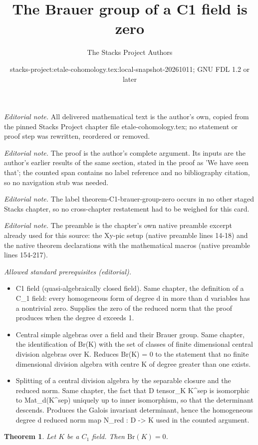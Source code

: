 \documentclass[10pt,a4paper]{amsart}
\title{The Brauer group of a C1 field is zero}
\author{The Stacks Project Authors}
\date{stacks-project:etale-cohomology.tex:local-snapshot-20261011; GNU FDL 1.2 or later}
\theoremstyle{plain}
\newtheorem{theorem}[subsection]{Theorem}
\theoremstyle{definition}
\theoremstyle{remark}
\numberwithin{equation}{subsection}
\begin{document}
\maketitle
\noindent\textit{Editorial note.} All delivered mathematical text is the author's own, copied from the pinned Stacks Project chapter file etale-cohomology.tex; no statement or proof step was rewritten, reordered or removed.\par\medskip
\noindent\textit{Editorial note.} The proof is the author's complete argument. Its inputs are the author's earlier results of the same section, stated in the proof as 'We have seen that'; the counted span contains no label reference and no bibliography citation, so no navigation stub was needed.\par\medskip
\noindent\textit{Editorial note.} The label theorem-C1-brauer-group-zero occurs in no other staged Stacks chapter, so no cross-chapter restatement had to be weighed for this card.\par\medskip
\noindent\textit{Editorial note.} The preamble is the chapter's own native preamble excerpt already used for this source: the Xy-pic setup (native preamble lines 14-18) and the native theorem declarations with the mathematical macros (native preamble lines 154-217).\par\medskip
\noindent\textit{Allowed standard prerequisites (editorial).}\begin{itemize}
\item C1 field (quasi-algebraically closed field). Same chapter, the definition of a C\_1 field: every homogeneous form of degree d in more than d variables has a nontrivial zero. Supplies the zero of the reduced norm that the proof produces when the degree d exceeds 1.
\item Central simple algebras over a field and their Brauer group. Same chapter, the identification of Br(K) with the set of classes of finite dimensional central division algebras over K. Reduces Br(K) = 0 to the statement that no finite dimensional division algebra with centre K of degree greater than one exists.
\item Splitting of a central division algebra by the separable closure and the reduced norm. Same chapter, the fact that D tensor\_K K\textasciicircum{}sep is isomorphic to Mat\_d(K\textasciicircum{}sep) uniquely up to inner isomorphism, so that the determinant descends. Produces the Galois invariant determinant, hence the homogeneous degree d reduced norm map N\_red : D -> K used in the counted argument.
\end{itemize}\medskip
\begin{theorem}
\label{theorem-C1-brauer-group-zero}
Let $K$ be a $C_1$ field. Then $\text{Br}(K) = 0$.
\end{theorem}
\end{document}
